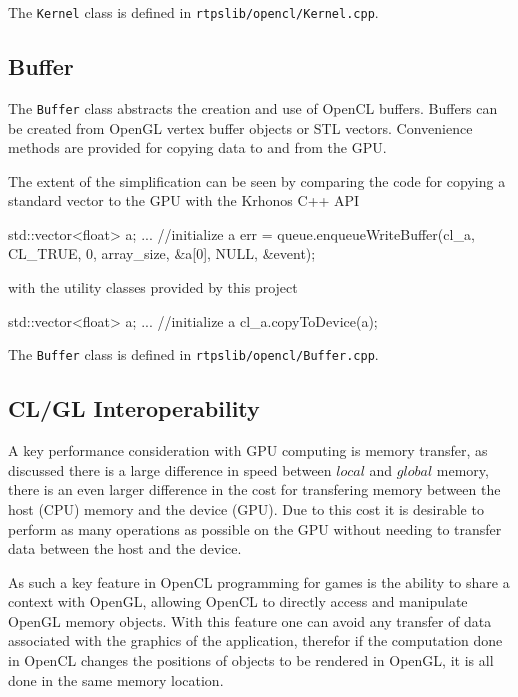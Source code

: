The \verb|Kernel| class is defined in \verb|rtpslib/opencl/Kernel.cpp|.


\subsection{Buffer}

The \verb|Buffer| class abstracts the creation and use of OpenCL buffers.
Buffers can be created from OpenGL vertex buffer objects or STL vectors.
Convenience methods are provided for copying data to and from the GPU.

The extent of the simplification can be seen by comparing the code for copying a
standard vector to the GPU with the Krhonos C++ API
\begin{cppcode}{0}
     std::vector<float> a; 
     ... //initialize a 
     err = queue.enqueueWriteBuffer(cl_a, CL_TRUE, 0, array_size, &a[0], NULL, 
         &event);
\end{cppcode}

with the utility classes provided by this project
\begin{cppcode}{0}
    std::vector<float> a; 
     ... //initialize a 
    cl_a.copyToDevice(a);
\end{cppcode}


The \verb|Buffer| class is defined in \verb|rtpslib/opencl/Buffer.cpp|.


\subsection{CL/GL Interoperability}
A key performance consideration with GPU computing is memory transfer, as
discussed there is a large difference in speed between $local$ and $global$
memory, there is an even larger difference in the cost for transfering memory
between the host (CPU) memory and the device (GPU). Due to this cost it is
desirable to perform as many operations as possible on the GPU without needing
to transfer data between the host and the device.


As such a key feature in OpenCL programming for games is the ability to share a
context with OpenGL, allowing OpenCL to directly access and manipulate OpenGL
memory objects. With this feature one can avoid any transfer of data associated
with the graphics of the application, therefor if the computation done in
OpenCL changes the positions of objects to be rendered in OpenGL, it is all
done in the same memory location.



